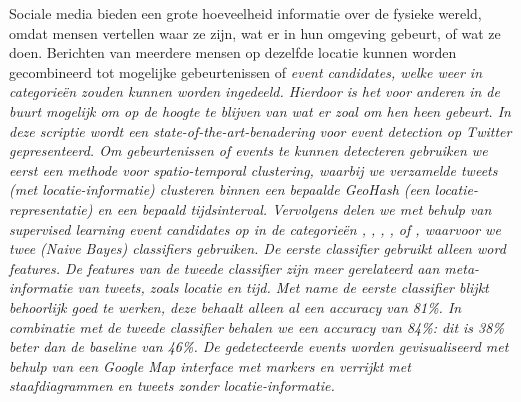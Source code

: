 {}
Sociale media bieden een grote hoeveelheid informatie over de fysieke wereld, 
omdat mensen vertellen waar ze zijn, wat er in hun
omgeving gebeurt, of wat ze doen. Berichten van meerdere mensen op dezelfde
locatie kunnen worden gecombineerd tot mogelijke gebeurtenissen of \it{event candidates},
welke weer in categorie\"en zouden kunnen worden ingedeeld.
Hierdoor is het voor anderen in de buurt mogelijk om op de hoogte te blijven van wat er zoal
om hen heen gebeurt.
\vl
In deze scriptie wordt een \it{state-of-the-art}-benadering voor 
\it{event detection} op Twitter gepresenteerd. Om gebeurtenissen of \it{events} te kunnen detecteren gebruiken we eerst een methode voor \it{spatio-temporal clustering}, waarbij 
we verzamelde tweets (met locatie-informatie) clusteren binnen een bepaalde \it{GeoHash} (een locatie-representatie) en een bepaald
tijdsinterval. Vervolgens delen we met behulp van \it{supervised learning} event candidates op in de categorie\"en , 
, , ,
 of , waarvoor we twee
(\it{Naive Bayes}) \it{classifiers} gebruiken. De eerste classifier gebruikt alleen 
\it{word features}. De features van de tweede classifier zijn meer gerelateerd aan 
\it{meta-informatie} van tweets, zoals locatie en tijd.
Met name de eerste classifier blijkt behoorlijk goed te werken, deze behaalt 
alleen al een \it{accuracy} van 81\%. In combinatie met de tweede classifier
behalen we een accuracy van 84\%: dit is 38\% beter dan de \it{baseline} van 46\%. De gedetecteerde events worden gevisualiseerd met behulp
van een \it{Google Map interface} met \it{markers} en verrijkt met staafdiagrammen en
tweets zonder locatie-informatie.
\vspace{\fill}

\newpage


